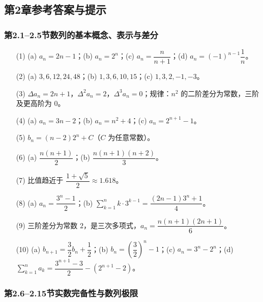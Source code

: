 \documentclass[fontset=fandol]{ctexart}
\begin{document}
\subsection*{第2章参考答案与提示}

\subsubsection*{第2.1--2.5节\quad 数列的基本概念、表示与差分}

\begin{enumerate}
\item[(1)] (a) \(a_n = 2n-1\)；(b) \(a_n = 2^n\)；(c) \(a_n = \dfrac{n}{n+1}\)；(d) \(a_n = (-1)^{n-1} \dfrac{1}{n}\)。
\item[(2)] (a) \(3, 6, 12, 24, 48\)；(b) \(1, 3, 6, 10, 15\)；(c) \(1, 3, 2, -1, -3\)。
\item[(3)] \(\Delta a_n = 2n+1\)，\(\Delta^2 a_n = 2\)，\(\Delta^3 a_n = 0\)；规律：\(n^2\) 的二阶差分为常数，三阶及更高阶为 0。
\item[(4)] (a) \(a_n = 3n-2\)；(b) \(a_n = n^2 + 4\)；(c) \(a_n = 2^{n+1} - 1\)。
\item[(5)] \(b_n=(n-2)2^n+C\)（\(C\) 为任意常数）。
\item[(6)] (a) \(\dfrac{n(n+1)}{2}\)；(b) \(\dfrac{n(n+1)(n+2)}{3}\)。
\item[(7)] 比值趋近于 \(\dfrac{1+\sqrt{5}}{2} \approx 1.618\)。
\item[(8)] (a) \(a_n = \dfrac{3^n - 1}{2}\)；(b) \(\sum_{k=1}^{n} k \cdot 3^{k-1} = \dfrac{(2n-1)3^n + 1}{4}\)。
\item[(9)] 三阶差分为常数 \(2\)，是三次多项式，\(a_n=\dfrac{n(n+1)(2n+1)}{6}\)。
\item[(10)] (a) \(b_{n+1}=\dfrac{3}{2}b_n+\dfrac{1}{2}\)；(b) \(b_n=\left(\dfrac{3}{2}\right)^n-1\)；(c) \(a_n=3^n-2^n\)；(d) \(\sum_{k=1}^{n} a_k=\dfrac{3^{n+1}-3}{2}-(2^{n+1}-2)\)。
\end{enumerate}

\subsubsection*{第2.6--2.15节\quad 实数完备性与数列极限}
\end{document}
